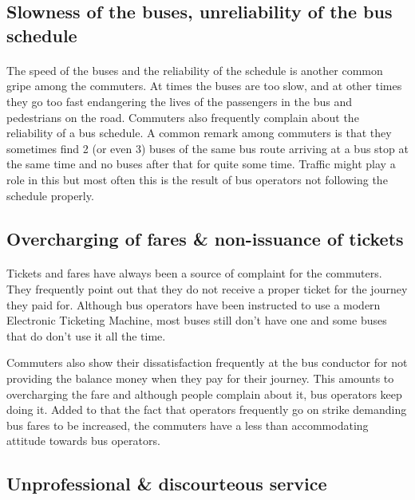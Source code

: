 \subsection{Slowness of the buses, unreliability of the bus schedule}

\paragraph{} The speed of the buses and the reliability of the schedule is another common gripe among the commuters. At times the buses are too slow, and at other times they go too fast endangering the lives of the passengers in the bus and pedestrians on the road. Commuters also frequently complain about the reliability of a bus schedule. A common remark among commuters is that they sometimes find 2 (or even 3) buses of the same bus route arriving at a bus stop at the same time and no buses after that for quite some time. Traffic might play a role in this but most often this is the result of bus operators not following the schedule properly.

\subsection{Overcharging of fares \& non-issuance of tickets}

\paragraph{} Tickets and fares have always been a source of complaint for the commuters. They frequently point out that they do not receive a proper ticket for the journey they paid for. Although bus operators have been instructed to use a modern Electronic Ticketing Machine, most buses still don't have one and some buses that do don't use it all the time.

Commuters also show their dissatisfaction frequently at the bus conductor for not providing the balance money when they pay for their journey. This amounts to overcharging the fare and although people complain about it, bus operators keep doing it. Added to that the fact that operators frequently go on strike demanding bus fares to be increased, the commuters have a less than accommodating attitude towards bus operators.

\subsection{Unprofessional \& discourteous service}

